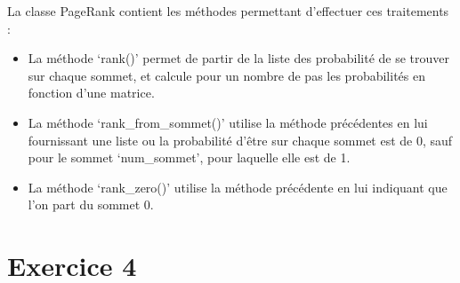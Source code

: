 \documentclass{article}
\begin{document}
	La classe PageRank contient les méthodes permettant d'effectuer ces traitements :
	
	\begin{itemize}
		\item La méthode `rank()' permet de partir de la liste des probabilité de se trouver sur chaque sommet, et calcule pour un nombre de pas les probabilités en fonction d'une matrice.
		\item La méthode `rank\_from\_sommet()' utilise la méthode précédentes en lui fournissant une liste ou  la probabilité d'être sur chaque sommet est de 0, sauf pour le sommet `num\_sommet', pour laquelle elle est de 1.
		\item La méthode `rank\_zero()' utilise la méthode précédente en lui indiquant que l'on part du sommet 0.
	\end{itemize}

\section{Exercice 4}



	 
\end{document}
